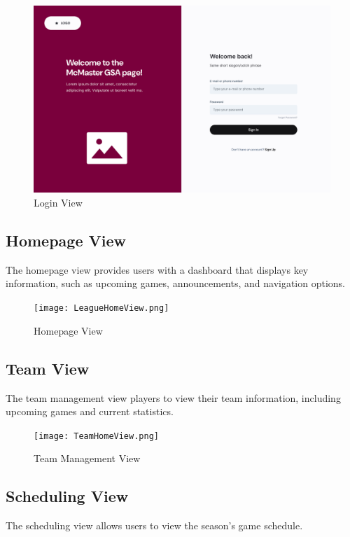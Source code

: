 \documentclass[12pt, titlepage]{article}
\begin{document}
\begin{figure}[H]
  \centering
  \includegraphics[scale=0.25]{loginpage.png}
  \caption{Login View}
  \label{fig:login_view}
\end{figure}

\newpage

\subsection{Homepage View}
The homepage view provides users with a dashboard that displays key information, such as upcoming games, announcements, and navigation options.

\begin{figure}[H]
  \centering
  \texttt{[image: LeagueHomeView.png]}
  \caption{Homepage View}
  \label{fig:homepage_view}
\end{figure}

\newpage

\subsection{Team View}
The team management view players to view their team information, including upcoming games and current statistics.

\begin{figure}[H]
  \centering
  \texttt{[image: TeamHomeView.png]}
  \caption{Team Management View}
  \label{fig:team_management_view}
\end{figure}

\newpage

\subsection{Scheduling View}
The scheduling view allows users to view the season's game schedule.
\end{document}
